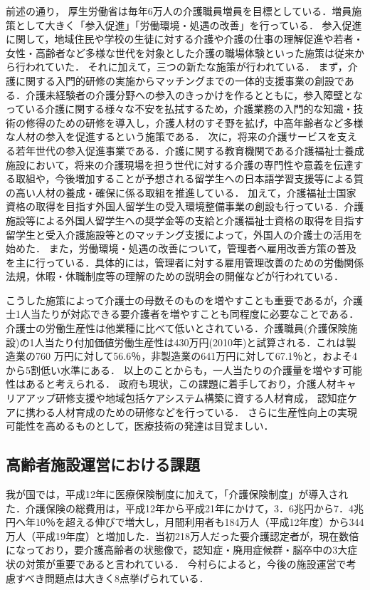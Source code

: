 前述の通り， 厚生労働省は毎年6万人の介護職員増員を目標としている．増員施策として大きく「参入促進」「労働環境・処遇の改善」を行っている．\cite{nurse_solution}
参入促進に関して，地域住民や学校の生徒に対する介護や介護の仕事の理解促進や若者・女性・高齢者など多様な世代を対象とした介護の職場体験といった施策は従来から行われていた．
それに加えて，三つの新たな施策が行われている．
まず，介護に関する入門的研修の実施からマッチングまでの一体的支援事業の創設である．介護未経験者の介護分野への参入のきっかけを作るとともに，参入障壁となっている介護に関する様々な不安を払拭するため，介護業務の入門的な知識・技術の修得のための研修を導入し，介護人材のすそ野を拡げ，中高年齢者など多様な人材の参入を促進するという施策である．
次に，将来の介護サービスを支える若年世代の参入促進事業である．介護に関する教育機関である介護福祉士養成施設において，将来の介護現場を担う世代に対する介護の専門性や意義を伝達する取組や，今後増加することが予想される留学生への日本語学習支援等による質の高い人材の養成・確保に係る取組を推進している．
加えて，介護福祉士国家資格の取得を目指す外国人留学生の受入環境整備事業の創設も行っている．介護施設等による外国人留学生への奨学金等の支給と介護福祉士資格の取得を目指す留学生と受入介護施設等とのマッチング支援によって，外国人の介護士の活用を始めた．
また，労働環境・処遇の改善について，管理者へ雇用改善方策の普及を主に行っている．具体的には，管理者に対する雇用管理改善のための労働関係法規，休暇・休職制度等の理解のための説明会の開催などが行われている．

こうした施策によって介護士の母数そのものを増やすことも重要であるが，介護士1人当たりが対応できる要介護者を増やすことも同程度に必要なことである．
介護士の労働生産性は他業種に比べて低いとされている．介護職員(介護保険施設)の1人当たり付加価値労働生産性は430万円(2010年)と試算される．これは製造業の760 万円に対して56.6％，非製造業の641万円に対して67.1％と，およそ4から5割低い水準にある．
以上のことからも，一人当たりの介護量を増やす可能性はあると考えられる．
政府も現状，この課題に着手しており，介護人材キャリアアップ研修支援や地域包括ケアシステム構築に資する人材育成， 認知症ケアに携わる人材育成のための研修などを行っている．
さらに生産性向上の実現可能性を高めるものとして，医療技術の発達は目覚ましい．

\subsection{高齢者施設運営における課題}
我が国では，平成12年に医療保険制度に加えて，「介護保険制度」が導入された．介護保険の総費用は，平成12年から平成21年にかけて，3．6兆円から7．4兆円へ年10％を超える伸びで増大し，月間利用者も184万人（平成12年度）から344万人（平成19年度）と増加した．当初218万人だった要介護認定者が，現在数倍になっており，要介護高齢者の状態像で，認知症・廃用症候群・脳卒中の3大症状の対策が重要であると言われている．
今村ら\cite{nursing_management}によると，今後の施設運営で考慮すべき問題点は大きく8点挙げられている．

